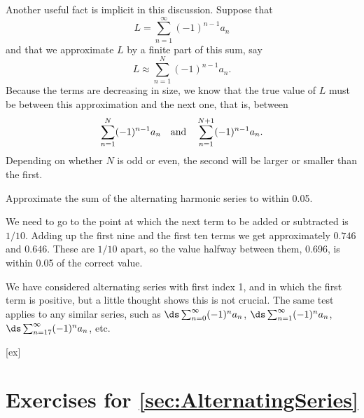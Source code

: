 Another useful fact is implicit in this discussion. Suppose that 
$$L=\sum_{n=1}^\infty (-1)^{n-1} a_n$$
and that we approximate $L$ by a finite part of this sum, say
$$L\approx \sum_{n=1}^N (-1)^{n-1} a_n.$$
Because the terms are decreasing in size, we know that the true value
of $L$ must be between this approximation and the next one, that is,
between 
$$
  \sum_{n=1}^N (-1)^{n-1} a_n \quad \hbox{and}\quad
  \sum_{n=1}^{N+1} (-1)^{n-1} a_n.
$$
Depending on whether $N$ is odd or even, the second will be larger or
smaller than the first.

\begin{example}{}{}
Approximate the sum of the alternating harmonic series to within 0.05.
\end{example}
\begin{solution}
We need to go to the point at which the next term to be added
or subtracted is $1/10$. Adding up the first nine and the first ten
terms we get approximately $0.746$ and $0.646$. These are $1/10$
apart, so the value halfway between them, 0.696, is within 0.05 of the correct value.
\end{solution}

We have considered alternating series with first index 1, and in which
the first term is positive, but a little thought shows this is not
crucial. The same test applies to any similar series, such as
$\ds\sum_{n=0}^\infty (-1)^n a_n$, $\ds\sum_{n=1}^\infty (-1)^n a_n$, 
$\ds\sum_{n=17}^\infty (-1)^n a_n$, etc.

[ex]
\section*{Exercises for \ref{sec:AlternatingSeries}}

